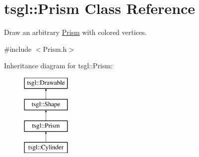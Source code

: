 \hypertarget{classtsgl_1_1_prism}{}\section{tsgl\+:\+:Prism Class Reference}
\label{classtsgl_1_1_prism}


Draw an arbitrary \hyperlink{classtsgl_1_1_prism}{Prism} with colored vertices.  




{\ttfamily \#include $<$Prism.\+h$>$}

Inheritance diagram for tsgl\+:\+:Prism\+:\begin{figure}[H]
\begin{center}
\leavevmode
\includegraphics[height=4.000000cm]{classtsgl_1_1_prism}
\end{center}
\end{figure}
